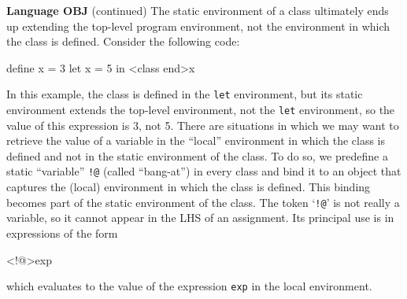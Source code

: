 \begin{minipage}[t]{\sw}
\slidenumber
\LARGE
{\bf Language OBJ} (continued)\exx
The static environment of a class ultimately ends up extending
the top-level program environment,
not the environment in which the class is defined.
Consider the following code:
\Large
\begin{qv}
define x = 3
let
  x = 5
in
  <class end>x
\end{qv}
\LARGE
In this example,
the class is defined in the \verb'let' environment,
but its static environment
extends the top-level environment,
not the \verb'let' environment,
so the value of this expression is 3, not 5.\exx
There are situations in which we may want
to retrieve the value of a variable in the ``local'' environment
in which the class is defined
and not in the static environment of the class.
To do so, we predefine a static ``variable'' \verb'!@'
(called ``bang-at'') in every class
and bind it to an object that captures the (local) environment
in which the class is defined.
This binding becomes part of the static environment of the class.
The token `\verb'!@'' is not really a variable,
so it cannot appear in the LHS of an assignment.
Its principal use is in expressions of the form
\Large
\begin{qv}
<!@>exp
\end{qv}
\LARGE
which evaluates to the value of the expression \verb'exp'
in the local environment.
\end{minipage}
